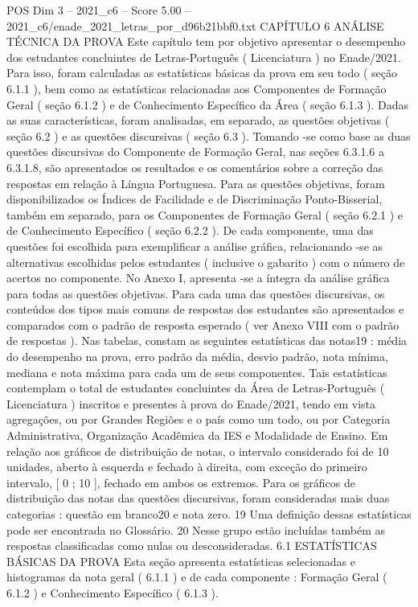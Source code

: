 \begin{textsample}{POS Dim 3 – 2021\_c6 – Score 5.00 – 2021\_c6/enade\_2021\_letras\_por\_d96b21bbf0.txt}  \label{ex:f3_pos_047}
CAPÍTULO 6 ANÁLISE TÉCNICA DA PROVA Este capítulo tem por objetivo apresentar o desempenho dos estudantes concluintes de Letras-Português ( Licenciatura ) no Enade/2021.
Para isso, foram calculadas as estatísticas básicas da prova em seu todo ( seção 6.1.1 ), bem como as estatísticas relacionadas aos Componentes de Formação Geral ( seção 6.1.2 ) e de Conhecimento Específico da Área ( seção 6.1.3 ).
Dadas as suas características, foram analisadas, em separado, as questões objetivas ( seção 6.2 ) e as questões discursivas ( seção 6.3 ).
Tomando -se como base as duas questões discursivas do Componente de Formação Geral, nas seções 6.3.1.6 a 6.3.1.8, são apresentados os resultados e os comentários sobre a correção das respostas em relação à Língua Portuguesa.
Para as questões objetivas, foram disponibilizados os Índices de Facilidade e de Discriminação Ponto-Bisserial, também em separado, para os Componentes de Formação Geral ( seção 6.2.1 ) e de Conhecimento Específico ( seção 6.2.2 ).
De cada componente, uma das questões foi escolhida para exemplificar a análise gráfica, relacionando -se as alternativas escolhidas pelos estudantes ( inclusive o gabarito ) com o número de acertos no componente.
No Anexo I, apresenta -se a íntegra da análise gráfica para todas as questões objetivas.
Para cada uma das questões discursivas, os conteúdos dos tipos mais comuns de respostas dos estudantes são apresentados e comparados com o padrão de resposta esperado ( ver Anexo VIII com o padrão de respostas ).
Nas tabelas, constam as seguintes estatísticas das notas19 : média do desempenho na prova, erro padrão da média, desvio padrão, nota mínima, mediana e nota máxima para cada um de seus componentes.
Tais estatísticas contemplam o total de estudantes concluintes da Área de Letras-Português ( Licenciatura ) inscritos e presentes à prova do Enade/2021, tendo em vista agregações, ou por Grandes Regiões e o país como um todo, ou por Categoria Administrativa, Organização Acadêmica da IES e Modalidade de Ensino.
Em relação aos gráficos de distribuição de notas, o intervalo considerado foi de 10 unidades, aberto à esquerda e fechado à direita, com exceção do primeiro intervalo, [ 0 ; 10 ], fechado em ambos os extremos.
Para os gráficos de distribuição das notas das questões discursivas, foram consideradas mais duas categorias : questão em branco20 e nota zero. 19 Uma definição dessas estatísticas pode ser encontrada no Glossário. 20 Nesse grupo estão incluídas também as respostas classificadas como nulas ou desconsideradas. 6.1 ESTATÍSTICAS BÁSICAS DA PROVA Esta seção apresenta estatísticas selecionadas e histogramas da nota geral ( 6.1.1 ) e de cada componente : Formação Geral ( 6.1.2 ) e Conhecimento Específico ( 6.1.3 ).

\end{textsample}
